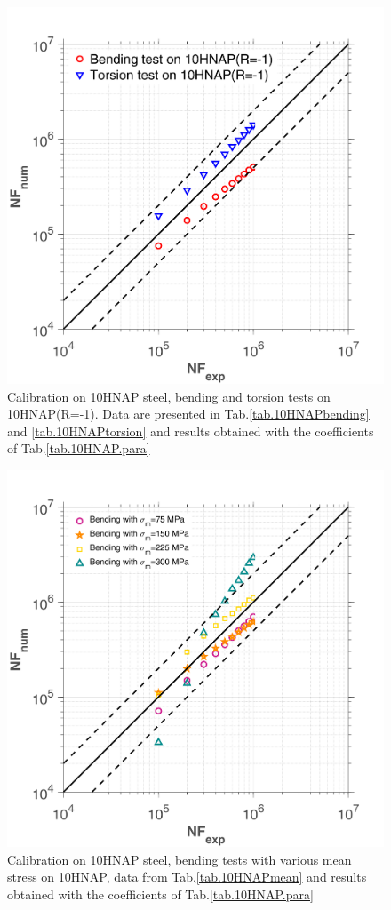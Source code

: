 \begin{figure}[!h]
	\centering
	\includegraphics[width=\textwidth]{figures//10HNAP_bt1D_err.png} 
	\caption{Calibration on 10HNAP steel, bending and torsion tests on 10HNAP(R=-1). Data are presented in Tab.\ref{tab.10HNAPbending} and  \ref{tab.10HNAPtorsion} and results obtained with the coefficients of Tab.\ref{tab.10HNAP.para}}
	\label{fig.10HNAP1}
\end{figure}
\begin{figure}[!h]
	\centering
	\includegraphics[width=\textwidth]{figures//10HNAP_b1D_m_err.png} 
	\caption{Calibration on 10HNAP steel, bending tests with various mean stress on 10HNAP, data from Tab.\ref{tab.10HNAPmean}  and results obtained with the coefficients of Tab.\ref{tab.10HNAP.para}}
	\label{fig.10HNAP2}
\end{figure}


